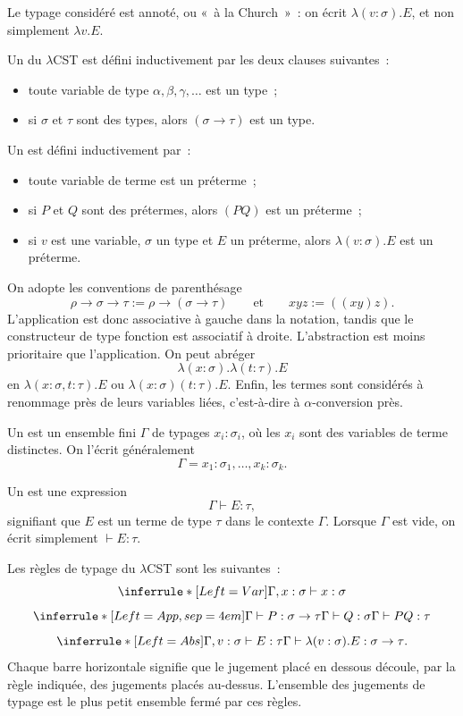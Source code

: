 Le typage considéré est annoté, ou « à la Church » : on écrit
$\lambda(v:\sigma).E$, et non simplement $\lambda v.E$.

\thingy Un  du $\lambda$CST est défini inductivement par les
deux clauses suivantes :
\begin{itemize}
\item toute variable de type $\alpha,\beta,\gamma,\ldots$ est un type ;
\item si $\sigma$ et $\tau$ sont des types, alors
  $(\sigma\to\tau)$ est un type.
\end{itemize}

Un  est défini inductivement par :
\begin{itemize}
\item toute variable de terme est un préterme ;
\item si $P$ et $Q$ sont des prétermes, alors $(PQ)$ est un préterme ;
\item si $v$ est une variable, $\sigma$ un type et $E$ un préterme,
  alors $\lambda(v:\sigma).E$ est un préterme.
\end{itemize}

On adopte les conventions de parenthésage
\[
\rho\to\sigma\to\tau
  :=\rho\to(\sigma\to\tau)
\qquad\text{et}\qquad
xyz:=((xy)z).
\]
L'application est donc associative à gauche dans la notation, tandis
que le constructeur de type fonction est associatif à droite.
L'abstraction est moins prioritaire que l'application. On peut abréger
\[
\lambda(x:\sigma).\lambda(t:\tau).E
\]
en $\lambda(x:\sigma,t:\tau).E$ ou
$\lambda(x:\sigma)(t:\tau).E$. Enfin, les termes sont considérés à
renommage près de leurs variables liées, c'est-à-dire à
$\alpha$-conversion près.

\begin{defn}
Un  est un ensemble fini $\Gamma$ de typages
$x_i:\sigma_i$, où les $x_i$ sont des variables de terme distinctes.
On l'écrit généralement
\[
\Gamma=x_1:\sigma_1,\ldots,x_k:\sigma_k.
\]

Un  est une expression
\[
\Gamma\vdash E:\tau,
\]
signifiant que $E$ est un terme de type $\tau$ dans le contexte
$\Gamma$. Lorsque $\Gamma$ est vide, on écrit simplement
$\vdash E:\tau$.
\end{defn}

\thingy Les règles de typage du $\lambda$CST sont les suivantes :
\[
\inferrule*[Left={Var}]
 { }
 {\Gamma,x:\sigma\vdash x:\sigma}
\]
\[
\inferrule*[Left={App},sep=4em]
 {\Gamma\vdash P:\sigma\to\tau\\
  \Gamma\vdash Q:\sigma}
 {\Gamma\vdash PQ:\tau}
\]
\[
\inferrule*[Left={Abs}]
 {\Gamma,v:\sigma\vdash E:\tau}
 {\Gamma\vdash\lambda(v:\sigma).E:\sigma\to\tau}.
\]
Chaque barre horizontale signifie que le jugement placé en dessous
découle, par la règle indiquée, des jugements placés au-dessus.
L'ensemble des jugements de typage est le plus petit ensemble fermé
par ces règles.

